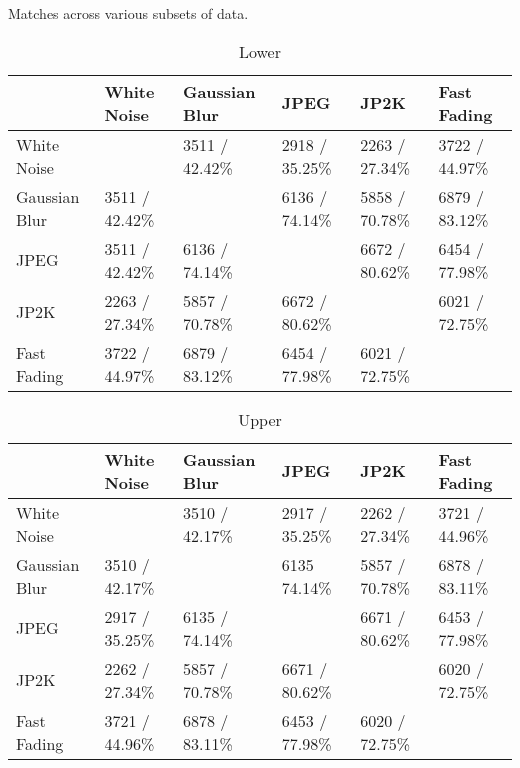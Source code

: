 Matches across various subsets of data.
\begin{table}[h]
\centering
\caption{Lower}
\label{my-label}
\begin{tabular}{|l|l|l|l|l|l|}
\hline
              & White Noise    & Gaussian Blur  & JPEG           & JP2K           & Fast Fading    \\ \hline
White Noise   &                & 3511 / 42.42\% & 2918 / 35.25\% & 2263 / 27.34\% & 3722 / 44.97\% \\ \hline
Gaussian Blur & 3511 / 42.42\% &                & 6136 / 74.14\% & 5858 / 70.78\% & 6879 / 83.12\% \\ \hline
JPEG          & 3511 / 42.42\% & 6136 / 74.14\% &                & 6672 / 80.62\% & 6454 / 77.98\% \\ \hline
JP2K          & 2263 / 27.34\% & 5857 / 70.78\%  & 6672 / 80.62\% &                & 6021 / 72.75\% \\ \hline
Fast Fading   & 3722 / 44.97\% & 6879 / 83.12\% & 6454 / 77.98\% & 6021 / 72.75\% &                \\ \hline
\end{tabular}
\end{table}

\begin{table}[h]
\centering
\caption{Upper}
\label{my-label}
\begin{tabular}{|l|l|l|l|l|l|}
\hline
              & White Noise    & Gaussian Blur  & JPEG           & JP2K           & Fast Fading    \\ \hline
White Noise   &                & 3510 / 42.17\% & 2917 / 35.25\% & 2262 / 27.34\% & 3721 / 44.96\% \\ \hline
Gaussian Blur & 3510 / 42.17\% &                & 6135 74.14\%   & 5857 / 70.78\% & 6878 / 83.11\% \\ \hline
JPEG          & 2917 / 35.25\% & 6135 / 74.14\% &                & 6671 / 80.62\% & 6453 / 77.98\% \\ \hline
JP2K          & 2262 / 27.34\% & 5857 / 70.78\% & 6671 / 80.62\% &                & 6020 / 72.75\% \\ \hline
Fast Fading   & 3721 / 44.96\% & 6878 / 83.11\% & 6453 / 77.98\% & 6020 / 72.75\% &                \\ \hline
\end{tabular}
\end{table}

